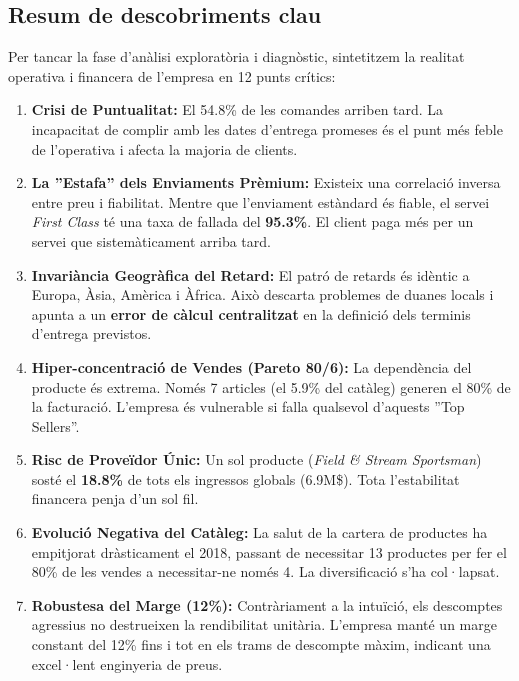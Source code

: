\documentclass[12pt,a4paper]{article}
\begin{document}
\subsection{Resum de descobriments clau}
Per tancar la fase d'anàlisi exploratòria i diagnòstic, sintetitzem la realitat operativa i financera de l'empresa en 12 punts crítics:

\begin{enumerate}
    \item \textbf{Crisi de Puntualitat:} El 54.8\% de les comandes arriben tard. La incapacitat de complir amb les dates d'entrega promeses és el punt més feble de l'operativa i afecta la majoria de clients.
    
    \item \textbf{La ''Estafa'' dels Enviaments Prèmium:} Existeix una correlació inversa entre preu i fiabilitat. Mentre que l'enviament estàndard és fiable, el servei \textit{First Class} té una taxa de fallada del \textbf{95.3\%}. El client paga més per un servei que sistemàticament arriba tard.
    
    \item \textbf{Invariància Geogràfica del Retard:} El patró de retards és idèntic a Europa, Àsia, Amèrica i Àfrica. Això descarta problemes de duanes locals i apunta a un \textbf{error de càlcul centralitzat} en la definició dels terminis d'entrega previstos.
    
    \item \textbf{Hiper-concentració de Vendes (Pareto 80/6):} La dependència del producte és extrema. Només 7 articles (el 5.9\% del catàleg) generen el 80\% de la facturació. L'empresa és vulnerable si falla qualsevol d'aquests ''Top Sellers''.
    
    \item \textbf{Risc de Proveïdor Únic:} Un sol producte (\textit{Field \& Stream Sportsman}) sosté el \textbf{18.8\%} de tots els ingressos globals (6.9M\$). Tota l'estabilitat financera penja d'un sol fil.
    
    \item \textbf{Evolució Negativa del Catàleg:} La salut de la cartera de productes ha empitjorat dràsticament el 2018, passant de necessitar 13 productes per fer el 80\% de les vendes a necessitar-ne només 4. La diversificació s'ha col·lapsat.
    
    \item \textbf{Robustesa del Marge (12\%):} Contràriament a la intuïció, els descomptes agressius no destrueixen la rendibilitat unitària. L'empresa manté un marge constant del 12\% fins i tot en els trams de descompte màxim, indicant una excel·lent enginyeria de preus.
    

\end{enumerate}
\end{document}
